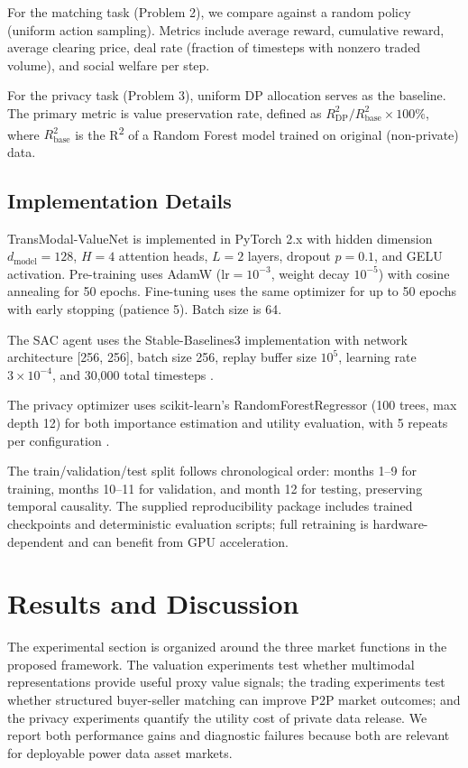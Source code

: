 \documentclass{ieeeaccess}
\begin{document}
For the matching task (Problem 2), we compare against a random policy (uniform action sampling). Metrics include average reward, cumulative reward, average clearing price, deal rate (fraction of timesteps with nonzero traded volume), and social welfare per step.

For the privacy task (Problem 3), uniform DP allocation serves as the baseline. The primary metric is value preservation rate, defined as $R^2_{\text{DP}} / R^2_{\text{base}} \times 100\%$, where $R^2_{\text{base}}$ is the R\textsuperscript{2} of a Random Forest model trained on original (non-private) data.

\subsection{Implementation Details}

TransModal-ValueNet is implemented in PyTorch 2.x \cite{b32} with hidden dimension $d_{\text{model}} = 128$, $H = 4$ attention heads, $L = 2$ layers, dropout $p = 0.1$, and GELU activation. Pre-training uses AdamW ($\text{lr}=10^{-3}$, weight decay $10^{-5}$) with cosine annealing for 50 epochs. Fine-tuning uses the same optimizer for up to 50 epochs with early stopping (patience 5). Batch size is 64.

The SAC agent uses the Stable-Baselines3 implementation with network architecture [256, 256], batch size 256, replay buffer size $10^5$, learning rate $3 \times 10^{-4}$, and 30,000 total timesteps \cite{b30}.

The privacy optimizer uses scikit-learn's RandomForestRegressor (100 trees, max depth 12) for both importance estimation and utility evaluation, with 5 repeats per configuration \cite{b29}.

The train/validation/test split follows chronological order: months 1--9 for training, months 10--11 for validation, and month 12 for testing, preserving temporal causality. The supplied reproducibility package includes trained checkpoints and deterministic evaluation scripts; full retraining is hardware-dependent and can benefit from GPU acceleration.

\section{Results and Discussion}
\label{sec:results}

The experimental section is organized around the three market functions in the proposed framework. The valuation experiments test whether multimodal representations provide useful proxy value signals; the trading experiments test whether structured buyer-seller matching can improve P2P market outcomes; and the privacy experiments quantify the utility cost of private data release. We report both performance gains and diagnostic failures because both are relevant for deployable power data asset markets.
\end{document}
